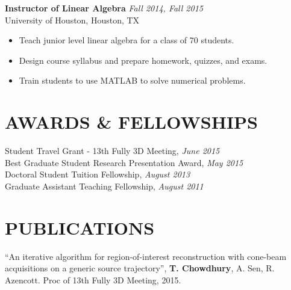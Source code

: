 \documentclass[margin,line,10pt]{res} %
\begin{document}
\begin{resume}
{\bf Instructor of Linear Algebra} \hfill {\em Fall 2014, Fall 2015} \\
University of Houston, Houston, TX
\begin{itemize}[leftmargin=12pt] \itemsep -2pt
\item Teach junior level linear algebra for a class of 70 students.
\item Design course syllabus and prepare homework, quizzes, and exams.
\item Train students to use MATLAB to solve numerical problems.
\end{itemize}




 

\section{AWARDS \& FELLOWSHIPS} 
Student Travel Grant - 13th Fully 3D Meeting, {\em June 2015} \\
Best Graduate Student Research Presentation Award, {\em May 2015} \\
Doctoral Student Tuition Fellowship, {\em August 2013} \\
Graduate Assistant Teaching Fellowship, {\em August 2011}

\section{PUBLICATIONS}
``An iterative algorithm for region-of-interest reconstruction with cone-beam acquisitions on a generic source trajectory'', \textbf{T. Chowdhury}, A. Sen, R. Azencott. Proc of 13th Fully 3D Meeting, 2015.


\end{resume}
\end{document}
